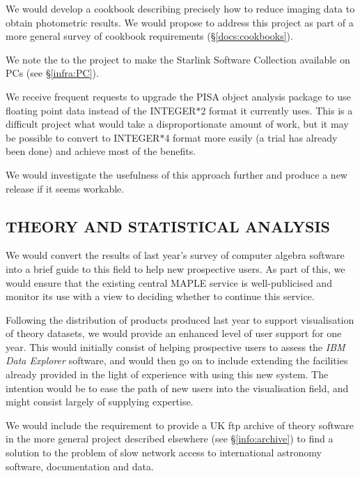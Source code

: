 {We would develop a cookbook describing precisely how to reduce
imaging data to obtain photometric results. We would propose to
address this project as part of a more general survey of cookbook
requirements (\S\ref{docs:cookbooks}).}

{We note the  to the project to make the Starlink Software Collection
available on PCs (see \S\ref{infra:PC}).}

{We receive frequent requests to upgrade the PISA object analysis
package to use floating point data instead of the INTEGER$*$2 format
it currently uses. This is a difficult project what would take a
disproportionate amount of work, but it may be possible to convert to
INTEGER$*$4 format more easily (a trial has already been done) and
achieve most of the benefits.

We would investigate the usefulness of this approach further and
produce a new release if it seems workable.}

\subsection{THEORY AND STATISTICAL ANALYSIS}

{We would convert the results of last year's survey of computer
algebra software into a brief guide to this field to help new
prospective users. As part of this, we would ensure that the existing
central MAPLE service is well-publicised and monitor its use with a
view to deciding whether to continue this service.}

{Following the distribution of products produced last year to support
visualisation of theory datasets, we would provide an enhanced level
of user support for one year. This would initially consist of helping
prospective users to assess the {\em IBM Data Explorer} software, and
would then go on to include extending the facilities already provided
in the light of experience with using this new system. The intention
would be to ease the path of new users into the visualisation field,
and might consist largely of supplying expertise.}

{We would include the requirement to provide a UK ftp archive of
theory software in the more general project described elsewhere (see
\S\ref{info:archive}) to find a solution to the problem of slow network access
to international astronomy software, documentation and data.}

